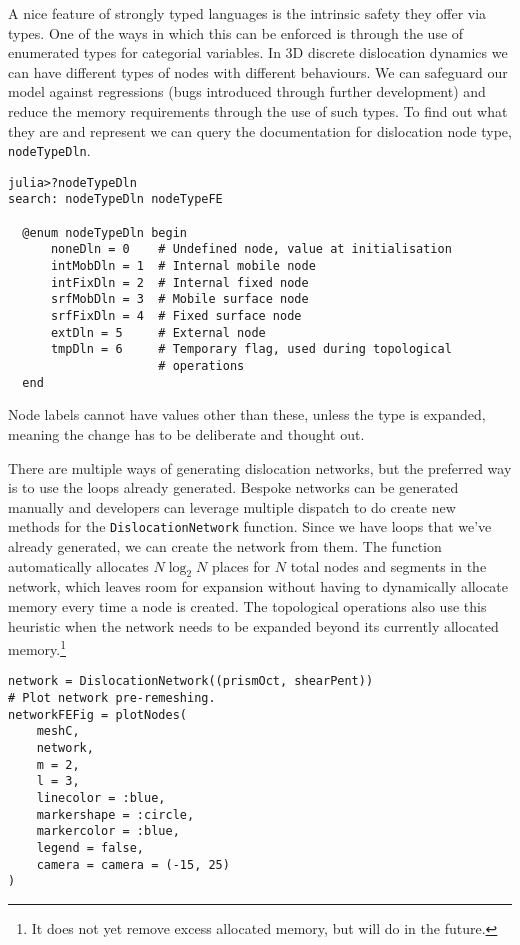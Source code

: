 A nice feature of strongly typed languages is the intrinsic safety they offer via types. One of the ways in which this can be enforced is through the use of enumerated types for categorial variables. In 3D discrete dislocation dynamics we can have different types of nodes with different behaviours. We can safeguard our model against regressions (bugs introduced through further development) and reduce the memory requirements through the use of such types. To find out what they are and represent we can query the documentation for dislocation node type, \texttt{nodeTypeDln}.
\begin{verbatim}
julia>?nodeTypeDln
search: nodeTypeDln nodeTypeFE

  @enum nodeTypeDln begin
      noneDln = 0    # Undefined node, value at initialisation
      intMobDln = 1  # Internal mobile node
      intFixDln = 2  # Internal fixed node
      srfMobDln = 3  # Mobile surface node
      srfFixDln = 4  # Fixed surface node
      extDln = 5     # External node
      tmpDln = 6     # Temporary flag, used during topological 
                     # operations
  end 
\end{verbatim}
Node labels cannot have values other than these, unless the type is expanded, meaning the change has to be deliberate and thought out.

There are multiple ways of generating dislocation networks, but the preferred way is to use the loops already generated. Bespoke networks can be generated manually and developers can leverage multiple dispatch to do create new methods for the \texttt{DislocationNetwork} function. Since we have loops that we've already generated, we can create the network from them. The function automatically allocates $N\log_2N$ places for $N$ total nodes and segments in the network, which leaves room for expansion without having to dynamically allocate memory every time a node is created. The topological operations also use this heuristic when the network needs to be expanded beyond its currently allocated memory.\footnote{It does not yet remove excess allocated memory, but will do in the future.}
\begin{verbatim}
network = DislocationNetwork((prismOct, shearPent))
# Plot network pre-remeshing.
networkFEFig = plotNodes(
    meshC,
    network,
    m = 2,
    l = 3,
    linecolor = :blue,
    markershape = :circle,
    markercolor = :blue,
    legend = false,
    camera = camera = (-15, 25)
)
\end{verbatim}

